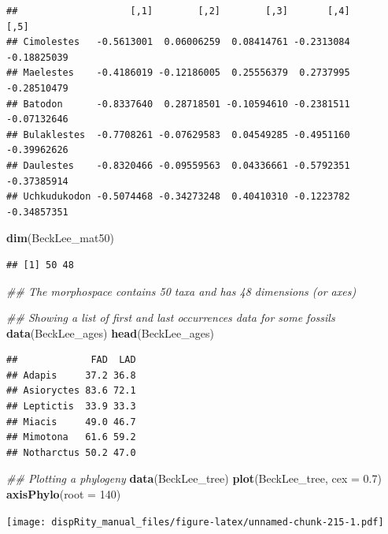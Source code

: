 \documentclass[
]{book}
\newenvironment{Shaded}{\begin{snugshade}}{\end{snugshade}}
\newcommand{\CommentTok}[1]{\textcolor[rgb]{0.56,0.35,0.01}{\textit{#1}}}
\newcommand{\DataTypeTok}[1]{\textcolor[rgb]{0.13,0.29,0.53}{#1}}
\newcommand{\DecValTok}[1]{\textcolor[rgb]{0.00,0.00,0.81}{#1}}
\newcommand{\FloatTok}[1]{\textcolor[rgb]{0.00,0.00,0.81}{#1}}
\newcommand{\KeywordTok}[1]{\textcolor[rgb]{0.13,0.29,0.53}{\textbf{#1}}}
\newcommand{\NormalTok}[1]{#1}
\begin{document}
\begin{verbatim}
##                    [,1]        [,2]        [,3]       [,4]        [,5]
## Cimolestes   -0.5613001  0.06006259  0.08414761 -0.2313084 -0.18825039
## Maelestes    -0.4186019 -0.12186005  0.25556379  0.2737995 -0.28510479
## Batodon      -0.8337640  0.28718501 -0.10594610 -0.2381511 -0.07132646
## Bulaklestes  -0.7708261 -0.07629583  0.04549285 -0.4951160 -0.39962626
## Daulestes    -0.8320466 -0.09559563  0.04336661 -0.5792351 -0.37385914
## Uchkudukodon -0.5074468 -0.34273248  0.40410310 -0.1223782 -0.34857351
\end{verbatim}

\begin{Shaded}
\begin{Highlighting}[]
\KeywordTok{dim}\NormalTok{(BeckLee\_mat50)}
\end{Highlighting}
\end{Shaded}

\begin{verbatim}
## [1] 50 48
\end{verbatim}

\begin{Shaded}
\begin{Highlighting}[]
\CommentTok{\#\# The morphospace contains 50 taxa and has 48 dimensions (or axes)}

\CommentTok{\#\# Showing a list of first and last occurrences data for some fossils}
\KeywordTok{data}\NormalTok{(BeckLee\_ages)}
\KeywordTok{head}\NormalTok{(BeckLee\_ages)}
\end{Highlighting}
\end{Shaded}

\begin{verbatim}
##             FAD  LAD
## Adapis     37.2 36.8
## Asioryctes 83.6 72.1
## Leptictis  33.9 33.3
## Miacis     49.0 46.7
## Mimotona   61.6 59.2
## Notharctus 50.2 47.0
\end{verbatim}

\begin{Shaded}
\begin{Highlighting}[]
\CommentTok{\#\# Plotting a phylogeny}
\KeywordTok{data}\NormalTok{(BeckLee\_tree)}
\KeywordTok{plot}\NormalTok{(BeckLee\_tree, }\DataTypeTok{cex =} \FloatTok{0.7}\NormalTok{)}
\KeywordTok{axisPhylo}\NormalTok{(}\DataTypeTok{root =} \DecValTok{140}\NormalTok{)}
\end{Highlighting}
\end{Shaded}

\texttt{[image: dispRity\_manual\_files/figure-latex/unnamed-chunk-215-1.pdf]}
\end{document}
